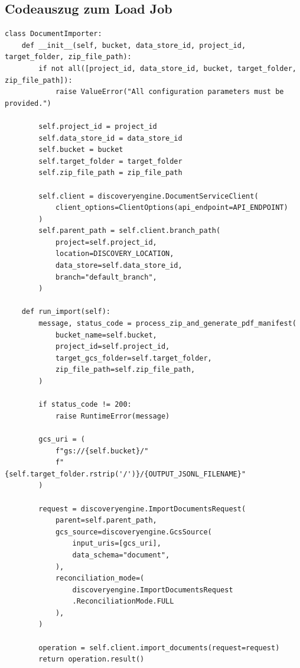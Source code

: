 \documentclass[
  10pt,
  ngerman,
  a4paper,
  toc=graduated,
  numbers=noenddot,
  headings=standardclasses,
  nonumberlist
]{scrartcl}
\begin{document}
\newpage
\subsection{Codeauszug zum Load Job}
\label{anhang_load_job}

\begin{lstlisting}[style=pythoncode, numbers=none, caption={Orchestrierung des Imports in die Discovery Engine}, label={lst:load_job}]
class DocumentImporter:
    def __init__(self, bucket, data_store_id, project_id, target_folder, zip_file_path):
        if not all([project_id, data_store_id, bucket, target_folder, zip_file_path]):
            raise ValueError("All configuration parameters must be provided.")

        self.project_id = project_id
        self.data_store_id = data_store_id
        self.bucket = bucket
        self.target_folder = target_folder
        self.zip_file_path = zip_file_path

        self.client = discoveryengine.DocumentServiceClient(
            client_options=ClientOptions(api_endpoint=API_ENDPOINT)
        )
        self.parent_path = self.client.branch_path(
            project=self.project_id,
            location=DISCOVERY_LOCATION,
            data_store=self.data_store_id,
            branch="default_branch",
        )

    def run_import(self):
        message, status_code = process_zip_and_generate_pdf_manifest(
            bucket_name=self.bucket,
            project_id=self.project_id,
            target_gcs_folder=self.target_folder,
            zip_file_path=self.zip_file_path,
        )

        if status_code != 200:
            raise RuntimeError(message)

        gcs_uri = (
            f"gs://{self.bucket}/"
            f"{self.target_folder.rstrip('/')}/{OUTPUT_JSONL_FILENAME}"
        )

        request = discoveryengine.ImportDocumentsRequest(
            parent=self.parent_path,
            gcs_source=discoveryengine.GcsSource(
                input_uris=[gcs_uri],
                data_schema="document",
            ),
            reconciliation_mode=(
                discoveryengine.ImportDocumentsRequest
                .ReconciliationMode.FULL
            ),
        )

        operation = self.client.import_documents(request=request)
        return operation.result()
\end{lstlisting}
\end{document}
